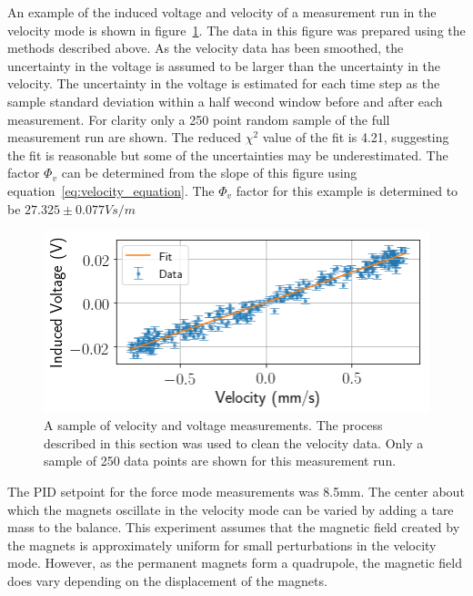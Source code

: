 \documentclass[aps,prstab,reprint,12pt]{revtex4-1}
\begin{document}
An example of the induced voltage and velocity of a measurement run in the velocity mode is shown in figure~\ref{fig:velocity-example}. The data in this figure was prepared using the methods described above. As the velocity data has been smoothed, the uncertainty in the voltage is assumed to be larger than the uncertainty in the velocity. The uncertainty in the voltage is estimated for each time step as the sample standard deviation within a half wecond window before and after each measurement. For clarity only a 250 point random sample of the full measurement run are shown. The reduced $\chi^2$ value of the fit is 4.21, suggesting the fit is reasonable but some of the uncertainties may be underestimated. The factor $\Phi_v$ can be determined from the slope of this figure using equation~\ref{eq:velocity_equation}. The $\Phi_v$ factor for this example is determined to be $27.325 \pm 0.077\si{Vs/m}$

\begin{figure}[b]
    \centering
    \includegraphics[width=\linewidth]{figs/data/velocity_data_example.png}
    \caption{A sample of velocity and voltage measurements. The process described in this section was used to clean the velocity data. Only a sample of 250 data points are shown for this measurement run.}
    \label{fig:velocity-example}
\end{figure}

The PID setpoint for the force mode measurements was 8.5mm. The center about which the magnets oscillate in the velocity mode can be varied by adding a tare mass to the balance. This experiment assumes that the magnetic field created by the magnets is approximately uniform for small perturbations in the velocity mode. However, as the permanent magnets form a quadrupole, the magnetic field does vary depending on the displacement of the magnets.
\end{document}

